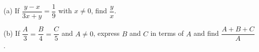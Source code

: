 (a) If $\dfrac{y-x}{3x+y}=\dfrac19$ with $x\ne0$, find $\dfrac yx$.

(b) If $\dfrac A3=\dfrac B4=\dfrac C5$ and $A\ne0$, express $B$ and $C$ in terms of $A$ and find $\dfrac{A+B+C}{A}$.
